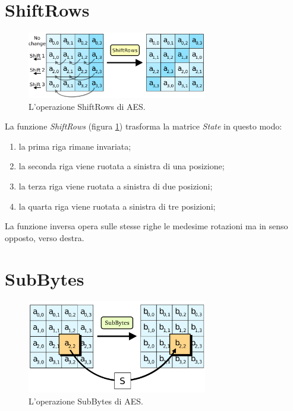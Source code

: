 \documentclass[12pt,a4paper,oneside]{book}
\begin{document}
\section{ShiftRows}

\begin{figure}[h]
\begin{center}
\includegraphics[width=0.7\textwidth]{img/shiftrows}
\caption{L'operazione ShiftRows di AES.\label{fig:aes-shiftrows}}
\end{center}
\end{figure}

La funzione \textit{ShiftRows} (figura \ref{fig:aes-shiftrows}) trasforma la matrice \textit{State} in questo modo:
\begin{enumerate}
\item la prima riga rimane invariata;
\item la seconda riga viene ruotata a sinistra di una posizione;
\item la terza riga viene ruotata a sinistra di due posizioni;
\item la quarta riga viene ruotata a sinistra di tre posizioni;
\end{enumerate}

La funzione inversa opera sulle stesse righe le medesime rotazioni ma in senso opposto, verso destra.

\section{SubBytes}
\label{sec:aes-subbytes}

\begin{figure}[h]
\begin{center}
\includegraphics[width=0.7\textwidth]{img/subbytes}
\caption{L'operazione SubBytes di AES.\label{fig:aes-subbytes}}
\end{center}
\end{figure}
\end{document}
